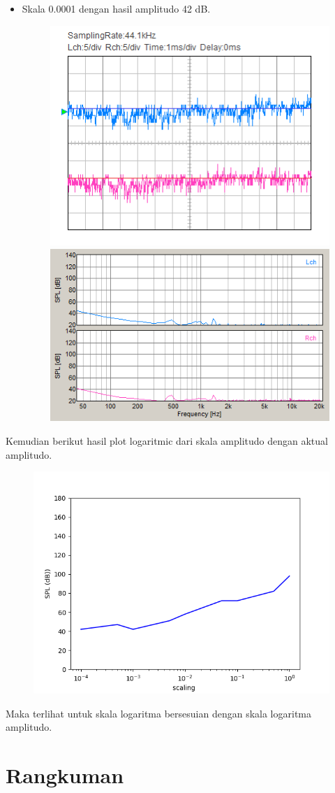 \documentclass[12pt,]{article}
\begin{document}
\begin{itemize}
		\newpage
		\item Skala 0.0001 dengan hasil amplitudo 42 dB.
		\begin{figure}[H]
			\centering
			\includegraphics[width=0.45\linewidth]{result/day_4/500Hz/tone00001}
			\includegraphics[width=0.45\linewidth]{result/day_4/500Hz/fft_tone00001}
		\end{figure}
	\end{itemize}

	Kemudian berikut hasil plot logaritmic dari skala amplitudo dengan aktual amplitudo.
	\begin{figure}[H]
		\centering
		\includegraphics[width=0.75\linewidth]{result/analisa/ampl_scaling}
	\end{figure}
	Maka terlihat untuk skala logaritma bersesuian dengan skala logaritma amplitudo.

	\newpage
	\section{Rangkuman}
\end{document}
